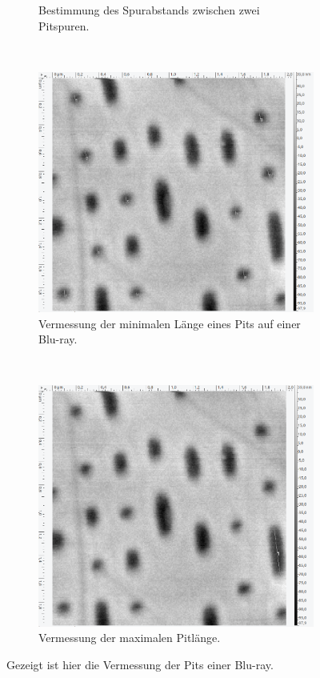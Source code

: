 \begin{figure}[H]
\begin{subfigure}[t]{0.4\textwidth}
	\caption{Bestimmung des Spurabstands zwischen zwei Pitspuren.}
	\end{subfigure}
	\\
	\begin{subfigure}[t]{0.4\textwidth}
	\includegraphics[width=\textwidth]{AFM_auswertung/bluray_Lmin.png}
	\caption{Vermessung der minimalen L\"ange eines Pits auf einer Blu-ray.}
	\end{subfigure}
	~
	\begin{subfigure}[t]{0.4\textwidth}
	\includegraphics[width=\textwidth]{AFM_auswertung/bluray_Lmax.png}
	\caption{Vermessung der maximalen Pitl\"ange.}
	\end{subfigure}
\caption{Gezeigt ist hier die Vermessung der Pits einer Blu-ray.}
\label{abb:BluRay}
\end{figure}
